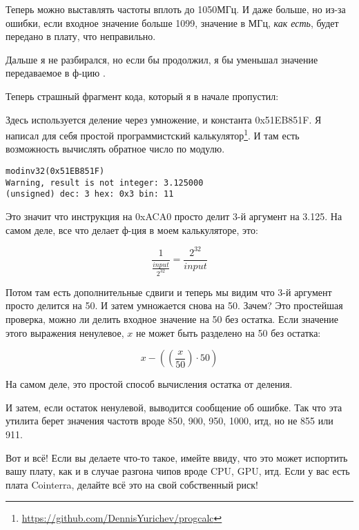 Теперь можно выставлять частоты вплоть до 1050МГц. И даже больше, но из-за ошибки, если входное значение больше 1099,
значение в МГц, \emph{как есть}, будет передано в плату, что неправильно.

Дальше я не разбирался, но если бы продолжил, я бы уменьшал значение передаваемое в ф-цию .

Теперь страшный фрагмент кода, который я в начале пропустил:



Здесь используется деление через умножение, и константа 0x51EB851F.
Я написал для себя простой программистский калькулятор\footnote{\url{https://github.com/DennisYurichev/progcalc}}.
И там есть возможность вычислять обратное число по модулю.

\begin{lstlisting}
modinv32(0x51EB851F)
Warning, result is not integer: 3.125000
(unsigned) dec: 3 hex: 0x3 bin: 11
\end{lstlisting}

Это значит что инструкция  на 0xACA0 просто делит 3-й аргумент на 3.125.
На самом деле, все что делает ф-ция  в моем калькуляторе, это:

\[
\frac{1}{\frac{input}{2^{32}}} = \frac{2^{32}}{input}
\]

Потом там есть дополнительные сдвиги и теперь мы видим что 3-й аргумент просто делится на 50.
И затем умножается снова на 50.
Зачем?
Это простейшая проверка, можно ли делить входное значение на 50 без остатка.
Если значение этого выражения ненулевое, $x$ не может быть разделено на 50 без остатка:

\[
x-((\frac{x}{50}) \cdot 50)
\]

На самом деле, это простой способ вычисления остатка от деления.

И затем, если остаток ненулевой, выводится сообщение об ошибке.
Так что эта утилита берет значения частотв вроде 850, 900, 950, 1000, итд, но не 855 или 911.

Вот и всё! Если вы делаете что-то такое, имейте ввиду, что это может испортить вашу плату, как и в случае разгона
чипов вроде \ac{CPU}, \ac{GPU}, итд.
Если у вас есть плата Cointerra, делайте всё это на свой собственный риск!

